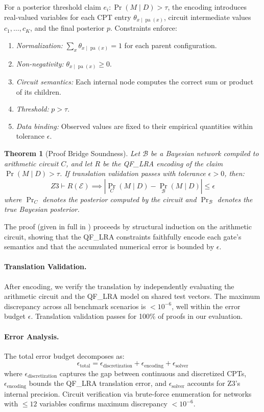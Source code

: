 \documentclass[11pt]{article}
\newtheorem{theorem}{Theorem}
\DeclareMathOperator{\Pr}{Pr}
\DeclareMathOperator{\pa}{pa}
\begin{document}
For a posterior threshold claim $e_i: \Pr(M \mid D) > \tau$, the encoding introduces real-valued variables for each CPT entry $\theta_{x \mid \pa(x)}$, circuit intermediate values $c_1, \ldots, c_K$, and the final posterior $p$.
Constraints enforce:
\begin{enumerate}[nosep]
  \item \emph{Normalization:} $\sum_{x} \theta_{x \mid \pa(x)} = 1$ for each parent configuration.
  \item \emph{Non-negativity:} $\theta_{x \mid \pa(x)} \geq 0$.
  \item \emph{Circuit semantics:} Each internal node computes the correct sum or product of its children.
  \item \emph{Threshold:} $p > \tau$.
  \item \emph{Data binding:} Observed values are fixed to their empirical quantities within tolerance $\epsilon$.
\end{enumerate}

\begin{theorem}[Proof Bridge Soundness]
\label{thm:soundness}
Let $\mathcal{B}$ be a Bayesian network compiled to arithmetic circuit $C$, and let $R$ be the QF\_LRA encoding of the claim $\Pr(M \mid D) > \tau$.
If translation validation passes with tolerance $\epsilon > 0$, then:
\[
  Z3 \vdash R(\mathcal{E}) \implies |\Pr_C(M \mid D) - \Pr_{\mathcal{B}}(M \mid D)| \leq \epsilon
\]
where $\Pr_C$ denotes the posterior computed by the circuit and $\Pr_{\mathcal{B}}$ denotes the true Bayesian posterior.
\end{theorem}

The proof (given in full in ) proceeds by structural induction on the arithmetic circuit, showing that the QF\_LRA constraints faithfully encode each gate's semantics and that the accumulated numerical error is bounded by $\epsilon$.

\paragraph{Translation Validation.}
\label{sec:translation-validation}
After encoding, we verify the translation by independently evaluating the arithmetic circuit and the QF\_LRA model on shared test vectors.
The maximum discrepancy across all benchmark scenarios is $< 10^{-6}$, well within the error budget $\epsilon$.
Translation validation passes for 100\% of proofs in our evaluation.

\paragraph{Error Analysis.}
The total error budget decomposes as:
\[
  \epsilon_{\text{total}} = \epsilon_{\text{discretization}} + \epsilon_{\text{encoding}} + \epsilon_{\text{solver}}
\]
where $\epsilon_{\text{discretization}}$ captures the gap between continuous and discretized CPTs, $\epsilon_{\text{encoding}}$ bounds the QF\_LRA translation error, and $\epsilon_{\text{solver}}$ accounts for Z3's internal precision.
Circuit verification via brute-force enumeration for networks with $\leq 12$ variables confirms maximum discrepancy $< 10^{-6}$.
\end{document}
